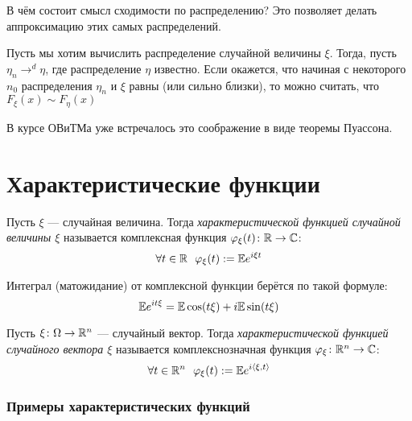 \begin{note}
	В чём состоит смысл сходимости по распределению? Это позволяет делать аппроксимацию этих самых распределений.
	
	Пусть мы хотим вычислить распределение случайной величины $\xi$. Тогда, пусть $\eta_n \to^d \eta$, где распределение $\eta$ известно. Если окажется, что начиная с некоторого $n_0$ распределения $\eta_n$ и $\xi$ равны (или сильно близки), то можно считать, что $F_\xi(x) \sim F_\eta(x)$
\end{note}

\begin{example}
	В курсе ОВиТМа уже встречалось это соображение в виде теоремы Пуассона.
\end{example}

\section{Характеристические функции}

\begin{definition}
	Пусть $\xi$ --- случайная величина. Тогда \textit{характеристической функцией случайной величины $\xi$} называется комплексная функция $\varphi_\xi(t) \colon \mathbb{R} \to \mathbb{C}$:
	\[
		\forall t \in \mathbb{R}\ \ \varphi_\xi(t) := \mathbb{E} e^{i\xi t}
	\]
\end{definition}

\begin{note}
	Интеграл (матожидание) от комплексной функции берётся по такой формуле:
	\[
		\mathbb{E} e^{it\xi} = \mathbb{E}\cos(t\xi) + i\mathbb{E}\sin(t\xi)
	\]
\end{note}

\begin{definition}
	Пусть $\xi \colon \Omega \to \mathbb{R}^n$ --- случайный вектор. Тогда \textit{характеристической функцией случайного вектора $\xi$} называется комплекснозначная функция $\varphi_\xi \colon \mathbb{R}^n \to \mathbb{C}$:
	\[
		\forall t \in \mathbb{R}^n\ \ \varphi_\xi(t) := \mathbb{E} e^{i\left\langle\xi, t\right\rangle}
	\]
\end{definition}

\subsubsection*{Примеры характеристических функций}

